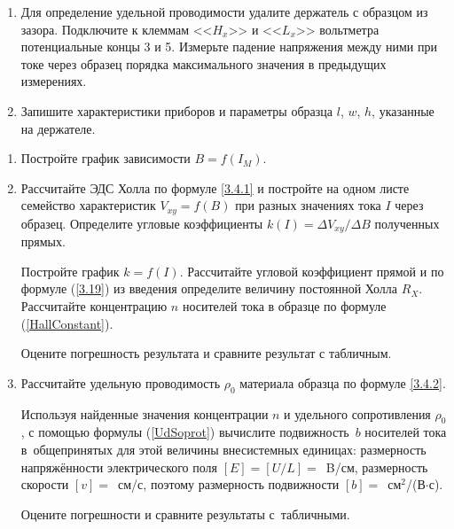 \begin{lab:task}
\begin{enumerate}
{Направление тока в образце показано знаками <<$+$>> и <<$-$>> на рис.~. Направление тока в обмотках электромагнита при установке разъёма $K_1$ в положение I показано стрелкой на торце магнита.

Зарисуйте в тетради образец. Укажите на рисунке направления тока, магнитного поля и отклонение носителей. По знаку
($\pm$) на клеммах цифрового вольтметра определите характер проводимости.}

\item{Для определение удельной проводимости удалите держатель с образцом из зазора. Подключите к клеммам <<$H_{x}$>> и <<$L_{x}$>> вольтметра потенциальные концы 3 и 5. Измерьте падение напряжения между ними при токе через образец порядка максимального значения в предыдущих измерениях.}

\item{ Запишите характеристики приборов и параметры образца $l$, $w$, $h$, указанные на держателе.}
\end{enumerate}

\begin{enumerate}

\item {Постройте график зависимости $B=f(I_{M})$.}

\item{ Рассчитайте ЭДС Холла по формуле \eqref{3.4.1} и постройте на одном листе семейство характеристик $V_{xy}=f(B)$ при разных значениях тока $I$ через образец. Определите угловые коэффициенты $k(I)=\Delta{V_{xy}}/\Delta B$ полученных прямых.

Постройте график $k=f(I)$. Рассчитайте угловой коэффициент прямой и по формуле (\ref{3.19}) из введения определите величину постоянной Холла $R_{X}$. Рассчитайте концентрацию $n$ носителей тока в образце по формуле (\ref{HallConstant}).

Оцените погрешность результата и сравните результат с табличным.}


\item{ Рассчитайте удельную проводимость $\rho_0$ материала образца по формуле \eqref{3.4.2}.

Используя найденные значения концентрации $n$ и удельного сопротивления $\rho_0$, с помощью формулы (\ref{UdSoprot}) вычислите подвижность~$b$ носителей тока в~общепринятых для этой величины внесистемных единицах: размерность напряжённости электрического поля $[E]=[U/L]=$~B/см, размерность скорости $[v]=$~см/с, поэтому размерность
подвижности $[b]=$~см$^2$/(В$\cdot$с).

Оцените погрешности и сравните результаты с~табличными.}
\end{enumerate}
\end{lab:task}

